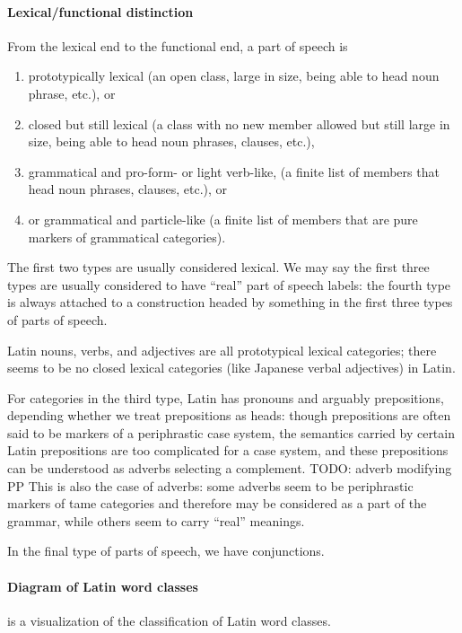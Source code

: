 \documentclass[a4paper, oneside, 12pt]{report}
\begin{document}
\paragraph*{Lexical/functional distinction}

From the lexical end to the functional end, 
a part of speech is 
\begin{enumerate}
    \item prototypically lexical 
    (an open class, large in size, being able to head noun phrase, etc.), or
    \item closed but still lexical 
    (a class with no new member allowed but still large in size, being able to head noun phrases, clauses, etc.),
    \item grammatical and pro-form- or light verb-like, 
    (a finite list of members that head noun phrases, clauses, etc.), or 
    \item or grammatical and particle-like
    (a finite list of members that are pure markers of grammatical categories).
\end{enumerate}
The first two types are usually considered lexical.
We may say the first three types are usually considered to have 
``real'' part of speech labels: 
the fourth type is always attached to a construction headed by 
something in the first three types of parts of speech.

Latin nouns, verbs, and adjectives are all prototypical lexical categories;
there seems to be no closed lexical categories (like Japanese verbal adjectives) in Latin.

For categories in the third type,
Latin has pronouns and arguably prepositions, 
depending whether we treat prepositions as heads:
though prepositions are often said to be markers of a periphrastic case system,
the semantics carried by certain Latin prepositions are too complicated for a case system,
and these prepositions can be understood as adverbs selecting a complement.
TODO: adverb modifying PP  
This is also the case of adverbs:
some adverbs seem to be periphrastic markers of \acs{tame} categories
and therefore may be considered as a part of the grammar,
while others seem to carry ``real'' meanings.

In the final type of parts of speech, 
we have conjunctions. 

\paragraph*{Diagram of Latin word classes} 
 is a visualization of the classification of Latin word classes.
\end{document}
